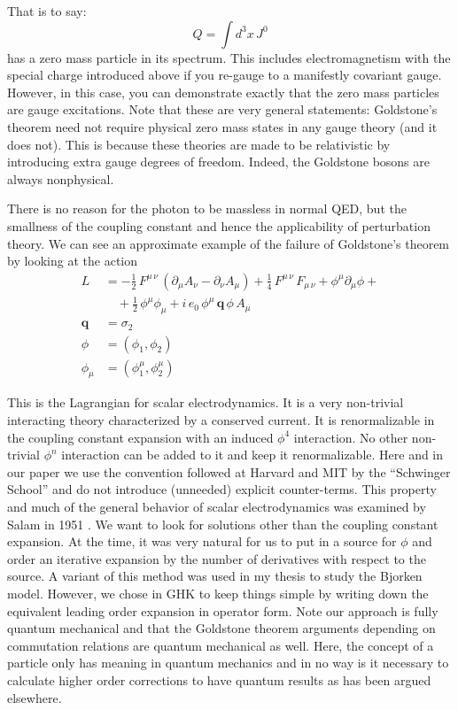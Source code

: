 \documentclass[letterpaper,twoside,preprintnumbers,slac_one]{revtex4}
\newcommand{\pa}{\partial}
\begin{document}
That is to say:
\begin{equation*}
  Q = \int d^3x\, J^0
\end{equation*}
has a zero mass particle in its spectrum. This includes
electromagnetism with the special charge introduced above if you
re-gauge to a manifestly covariant gauge. However, in this case, you
can demonstrate exactly that the zero mass particles are gauge
excitations. Note that these are very general statements: Goldstone's
theorem need not require physical zero mass states in any gauge theory
(and it does not). This is because these theories are made to be
relativistic by introducing extra gauge degrees of freedom. Indeed,
the Goldstone bosons are always nonphysical.

There is no reason for the photon to be massless in normal QED, but
the smallness of the coupling constant and hence the applicability of
perturbation theory. We can see an approximate example of the
failure of Goldstone's theorem by looking at the action
\begin{align*}
  L &= -\frac{1}{2}\,
  F^{\mu\, \nu}\, (\pa_{\mu}A_{\nu} - \pa_{\nu}A_{\mu}) +
    \frac{1}{4}\, F^{\mu\, \nu}\,F_{\mu\, \nu} + \phi^{\mu}\pa_{\mu}\phi  + \\
  &\quad+ \frac{1}{2}\, \phi^{\mu}\phi_{\mu} + i\,e_0\,
    \phi^{\mu}\, \mathbf{q}\, \phi\, A_{\mu} \\
  \mathbf{q} &= \sigma_2 \\
  \phi &= (\phi_1, \phi_2) \\
    \phi_{\mu} &= (\phi^{\mu}_{1},\phi^{\mu}_{2})
\end{align*}

This is the Lagrangian for scalar electrodynamics. It is a very
non-trivial interacting theory characterized by a conserved
current. It is renormalizable in the coupling constant expansion with
an induced $\phi^{4}$ interaction. No other non-trivial $\phi^{n}$
interaction can be added to it and keep it renormalizable. Here and in our paper we use the
convention followed at Harvard and MIT by the ``Schwinger School'' and do not introduce (unneeded) explicit
counter-terms. This property and much of the general behavior of scalar electrodynamics was examined by Salam in 1951
\cite{as;1951}. We want to look for solutions other than the coupling constant expansion.
At the time, it was very natural for us to put in a source for $\phi$
and order an iterative expansion by the number of derivatives with
respect to the source. A variant of this method was used in my thesis to study the Bjorken model.
However, we chose in GHK to keep things simple by writing down the equivalent leading order expansion
in operator form. Note our approach is fully quantum mechanical and that the Goldstone theorem arguments
depending on commutation relations are quantum mechanical as well. Here, the concept of a particle only has
meaning in quantum mechanics and in no way is it necessary to calculate higher order corrections to have
quantum results as has been argued elsewhere.
\end{document}
